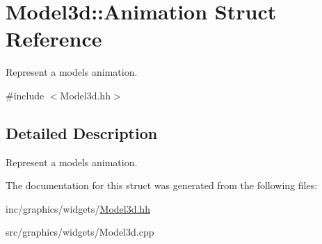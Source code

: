 \hypertarget{structModel3d_1_1Animation}{}\section{Model3d\+:\+:Animation Struct Reference}
\label{structModel3d_1_1Animation}


Represent a model\textquotesingle{}s animation.  




{\ttfamily \#include $<$Model3d.\+hh$>$}



\subsection{Detailed Description}
Represent a model\textquotesingle{}s animation. 

The documentation for this struct was generated from the following files\+:\begin{DoxyCompactItemize}
\item 
inc/graphics/widgets/\hyperlink{Model3d_8hh}{Model3d.\+hh}\item 
src/graphics/widgets/Model3d.\+cpp\end{DoxyCompactItemize}
